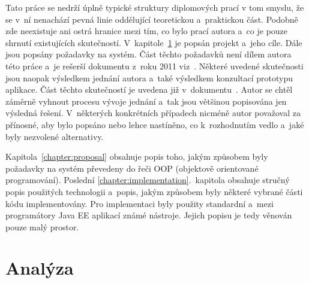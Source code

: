 \documentclass[11pt,draft,oneside]{fithesis2}
\begin{document}
Tato práce se nedrží úplně typické struktury diplomových prací v tom smyslu, že se v~ní nenachází pevná linie oddělující teoretickou a~praktickou část. Podobně zde neexistuje ani ostrá hranice mezi tím, co bylo prací autora a~co je pouze shrnutí existujících skutečností. V~kapitole~\ref{chapter:analysis} je popsán projekt a~jeho cíle. Dále jsou popsány požadavky na systém. Část těchto požadavků není dílem autora této práce a~je rešerší dokumentu z~roku 2011 viz~\cite{ARCH_2011_12_29}. Některé uvedené skutečnosti jsou naopak výsledkem jednání autora a~také výsledkem konzultací prototypu aplikace. Část těchto skutečností je uvedena již v~dokumentu~\cite{ARCH_2014_1_25}. Autor se chtěl záměrně vyhnout  procesu vývoje jednání a~tak jsou většinou popisována jen výsledná řešení. V~některých konkrétních případech nicméně autor považoval za přínosné, aby bylo popsáno nebo lehce nastíněno, co k~rozhodnutím vedlo a~jaké byly nezvolené alternativy.

Kapitola~\ref{chapter:proposal} obsahuje popis toho, jakým způsobem byly požadavky na systém převedeny do řeči OOP (objektově orientované programování). Poslední \ref{chapter:implementation}.~kapitola obsahuje stručný popis použitých technologii a~popis, jakým způsobem byly některé vybrané části kódu implementovány. Pro implementaci byly použity standardní a~mezi programátory Java EE aplikací známé nástroje. Jejich popisu je tedy věnován pouze malý prostor.









\chapter{Analýza}\label{chapter:analysis}

\end{document}
